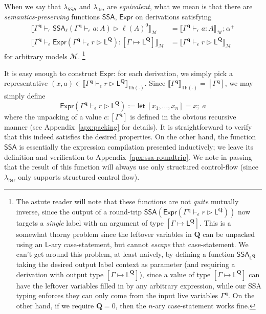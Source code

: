 \documentclass[acmsmall,screen,review]{acmart}
\newcommand{\mc}[1]{\ensuremath{\mathcal{#1}}}
\newcommand{\mb}[1]{\ensuremath{\mathbf{#1}}}
\newcommand{\ms}[1]{\ensuremath{\mathsf{#1}}}
\newcommand{\letexpr}[3]{\ensuremath{\ms{let}\;#1 = #2;\;#3}}
\newcommand{\hasty}[4]{#1 \vdash_{#2} #3: {#4}}
\newcommand{\haslb}[4]{#1 \vdash_{#2} #3 \rhd #4}
\newcommand{\etoty}[1]{[#1]}
\newcommand{\ltoty}[2]{[#1 \mapsto #2]}
\newcommand{\dnt}[1]{\llbracket{#1}\rrbracket}
\newcommand{\subiterexp}{\texorpdfstring{\(\lambda_{\ms{iter}}\)}{lambda-iter}}
\newcommand{\isotopessa}{\(\lambda_{\ms{SSA}}\)}
\begin{document}
When we say that \isotopessa{} and \subiterexp{} are \emph{equivalent}, what we mean is that there
are \emph{semantics-preserving} functions $\ms{SSA}$, $\ms{Expr}$ on derivations satisfying
\begin{align*}
\dnt{
  \haslb{\Gamma^{\mb{q}}}{\epsilon}{\ms{SSA}_\ell(\hasty{\Gamma^{\mb{q}}}{\epsilon}{a}{A})}
  {\ell(A)^0}
}_{\mc{M}} &= \dnt{\hasty{\Gamma^{\mb{q}}}{\epsilon}{a}{A}}_{\mc{M}} ; \alpha^+ \\
\dnt{
  \hasty{\Gamma^{\mb{q}}}{\epsilon}
    {\ms{Expr}(\haslb{\Gamma^{\mb{q}}}{\epsilon}{r}{\ms{L}^{\mb{Q}}})}
    {\ltoty{\Gamma}{\ms{L}^{\mb{Q}}}}
}_{\mc{M}} &= \dnt{\haslb{\Gamma^{\mb{q}}}{\epsilon}{r}{\ms{L}^{\mb{Q}}}}_{\mc{M}}
\end{align*}
for arbitrary models $\mc{M}$. \footnote{
  The astute reader will note that these functions are not 
  \emph{quite} mutually inverse, since the output of a round-trip 
  $\ms{SSA}(\ms{Expr}(\haslb{\Gamma^{\mb{q}}}{\epsilon}{r}{\ms{L}^{\mb{Q}}}))$ now targets a 
  \emph{single} label with an argument of type $\ltoty{\Gamma}{\ms{L}^{\mb{Q}}}$. This is a somewhat
  thorny problem since the leftover variables in $\mb{Q}$ can be unpacked using an $\ms{L}$-ary 
  case-statement, but cannot \emph{escape} that case-statement. We can't get around this problem,
  at least naively, by defining a function $\ms{SSA}_{\ms{L}^{\mb{Q}}}$ taking the desired output
  label context as parameter 
  (and requiring a derivation with output type $\ltoty{\Gamma}{\ms{L}^{\mb{Q}}}$), since a value of
  type $\ltoty{\Gamma}{\ms{L}^{\mb{Q}}}$ can have the leftover variables filled in by any
  arbitrary expression, while our SSA typing enforces they can only come from the input
  live variables $\Gamma^{\mb{q}}$. On the other hand, if we require $\mb{Q} = 0$, then the
  $n$-ary case-statement works fine.
}

It is easy enough to construct $\ms{Expr}$: for each derivation,
we simply pick a representative 
$
  (x, a) \in 
  \dnt{\haslb{\Gamma^{\mb{q}}}{\epsilon}{r}{\ms{L}^{\mb{Q}}}}_{\ms{Th(\cdot)}}
$. Since $\dnt{\Gamma^{\mb{q}}}_{\ms{Th}(\cdot)} = \etoty{\Gamma^{\mb{q}}}$, we may simply define
$$
\ms{Expr}(\haslb{\Gamma^{\mb{q}}}{\epsilon}{r}{\ms{L}^{\mb{Q}}}) := 
  \letexpr{[x_1,...,x_n]}{x}{a}
$$
where the unpacking of a value $c : \etoty{\Gamma^{\mb{q}}}$ is defined in the obvious recursive
manner (see Appendix~\ref{apx:packing} for details). It is straightforward to verify that this
indeed satisfies the desired properties. On the other hand, the function $\ms{SSA}$ is essentially
the expression compilation presented inductively; we leave its definition and verification to
Appendix~\ref{apx:ssa-roundtrip}. We note in passing that the result of this function will always
use only structured control-flow (since \subiterexp{} only supports structured control flow).  
\end{document}
